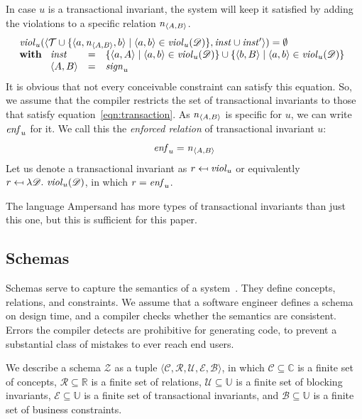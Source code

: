 \documentclass[runningheads]{llncs}
\newcommand{\id}[1]{\text{\it #1\/}}
\newcommand{\instance}{\mathbin{\id{inst}}}
\newcommand{\viol}[2]{\violC{#1}(#2)}
\newcommand{\violC}[1]{\id{viol}_{#1}}
\newcommand{\sign}[1]{\id{sign}_{#1}}
\newcommand{\enfRel}[1]{\id{enf}_{#1}}
\newcommand{\declare}[3]{\id{#1}_{\pair{#2}{#3}}}
\newcommand{\pair}[2]{\langle{#1},{#2}\rangle}
\newcommand{\triple}[3]{\langle{#1},{#2},{#3}\rangle}
\newcommand{\quintuple}[5]{\langle{#1},{#2},{#3},{#4},{#5}\rangle}
\newcommand{\concepts}{\mathcal{C}}
\newcommand{\Concepts}{\mathbb{C}}
\newcommand{\rels}{\mathcal{R}}   %
\newcommand{\Rels}{\mathbb{R}}   %
\newcommand{\triples}{\mathcal{T}}
\newcommand{\rules}{\mathcal{U}}
\newcommand{\transactions}{\mathcal{E}}
\newcommand{\busConstraints}{\mathcal{B}}
\newcommand{\Constraints}{\mathbb{U}}
\newcommand{\dataset}{\mathscr{D}}
\newcommand{\schema}{\mathscr{Z}}
\def\define#1{\label{dfn:#1}{\em #1}\index{#1}}
\begin{document}
   In case $u$ is a transactional invariant,
   the system will keep it satisfied by adding the violations to a specific relation $\declare{n}{A}{B}$.
\begin{equation}
   \begin{array}[t]{l}
      \viol{u}{\pair{\triples\cup\{\triple{a}{\declare{n}{A}{B}}{b}\mid\pair{a}{b}\in\viol{u}{\dataset}\}}{\instance\cup\instance'}}=\emptyset\\
      \text{\bf with\ }\begin{array}[t]{lcl}
         \instance&=&\{\pair{a}{A}\mid\pair{a}{b}\in\viol{u}{\dataset}\}\cup\{ \pair{b}{B}\mid\pair{a}{b}\in\viol{u}{\dataset}\}\\
         \pair{A}{B}&=&\sign{u}
      \end{array}
   \end{array}
\label{eqn:transaction}
\end{equation}
   It is obvious that not every conceivable constraint can satisfy this equation.
   So, we assume that the compiler restricts the set of transactional invariants to those that satisfy equation~\ref{eqn:transaction}.
   As $\declare{n}{A}{B}$ is specific for $u$, we can write $\enfRel{u}$ for it.
   We call this the \define{enforced relation} of transactional invariant $u$:
\begin{equation}
   \enfRel{u}=\declare{n}{A}{B}
\end{equation}
   Let us denote a transactional invariant as $r\mapsfrom\violC{u}$ or equivalently $r \mapsfrom \lambda \dataset.~\viol{u}{\dataset}$,
   in which $r=\enfRel{u}$.
   
   The language Ampersand has more types of transactional invariants than just this one,
   but this is sufficient for this paper.

\subsection{Schemas}
\label{sct:Schemas}
   Schemas serve to capture the semantics of a system~\cite{Spivak2012}.
   They define concepts, relations, and constraints.
   We assume that a software engineer defines a schema on design time, and a compiler checks whether the semantics are consistent.
   Errors the compiler detects are prohibitive for generating code,
   to prevent a substantial class of mistakes to ever reach end users.

   We describe a schema $\schema$ as a tuple $\quintuple{\concepts}{\rels}{\rules}{\transactions}{\busConstraints}$,
   in which $\concepts\subseteq\Concepts$ is a finite set of concepts,
   $\rels\subseteq\Rels$ is a finite set of relations,
   $\rules\subseteq\Constraints$ is a finite set of blocking invariants,
   $\transactions\subseteq\Constraints$ is a finite set of transactional invariants,
   and $\busConstraints\subseteq\Constraints$ is a finite set of business constraints.
\end{document}
